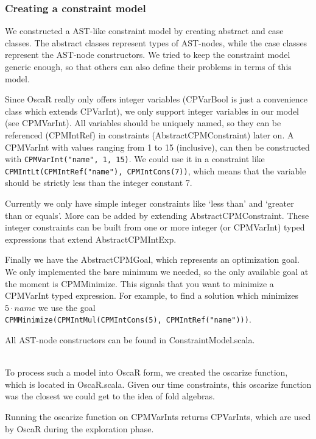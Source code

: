 \documentclass[a4paper]{article}
\begin{document}
\subsubsection{Creating a constraint model}
We constructed a AST-like constraint model by creating 
abstract and case classes. 
The abstract classes represent types of AST-nodes, 
while the case classes represent the AST-node constructors.
We tried to keep the constraint model generic enough,
so that others can also define their problems in terms of this model.

Since OscaR really only offers integer variables 
(CPVarBool is just a convenience class which extends CPVarInt),
we only support integer variables in our model (see CPMVarInt).
All variables should be uniquely named, 
so they can be referenced (CPMIntRef) in constraints (AbstractCPMConstraint) later on.
A CPMVarInt with values ranging from 1 to 15 (inclusive), 
can then be constructed with \verb|CPMVarInt("name", 1, 15)|.
We could use it in a constraint like 
\verb|CPMIntLt(CPMIntRef("name"), CPMIntCons(7))|,
which means that the variable should be strictly less than the integer constant 7.

Currently we only have simple integer constraints
like `less than' and `greater than or equals'.
More can be added by extending AbstractCPMConstraint.
These integer constraints can be built from one or more integer 
(or CPMVarInt) typed expressions that extend AbstractCPMIntExp.

Finally we have the AbstractCPMGoal, 
which represents an optimization goal.
We only implemented the bare minimum we needed,
so the only available goal at the moment is CPMMinimize.
This signals that you want to minimize a CPMVarInt typed
expression.
For example, to find a solution which minimizes $5\cdot name$ we use the goal
\\\verb|CPMMinimize(CPMIntMul(CPMIntCons(5), CPMIntRef("name")))|.

All AST-node constructors can be found in ConstraintModel.scala.

\hspace*{1em}\\
To process such a model into OscaR form, 
we created the oscarize function, which is located in OscaR.scala.
Given our time constraints, 
this oscarize function was the closest we could get to the idea of fold algebras.

Running the oscarize function on CPMVarInts returns CPVarInts,
which are used by OscaR during the exploration phase.
\end{document}
